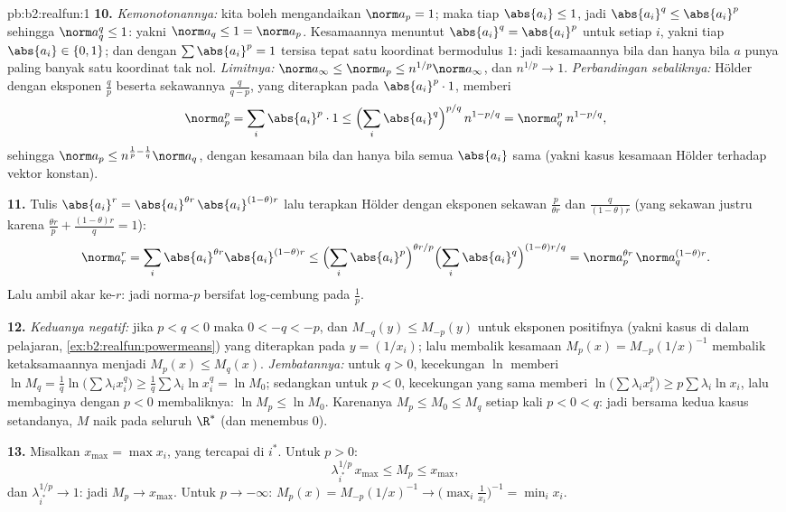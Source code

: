 \begin{solution}{pb:b2:realfun:1}
\textbf{10.} \emph{Kemonotonannya:} kita boleh mengandaikan $\norm a_p =
1$; maka tiap $\abs{a_i} \leq 1$, jadi $\abs{a_i}^q \leq \abs{a_i}^p$
sehingga $\norm a_q^q \leq 1$: yakni $\norm a_q \leq 1 = \norm a_p$.
Kesamaannya menuntut $\abs{a_i}^q = \abs{a_i}^p$ untuk setiap $i$,
yakni tiap $\abs{a_i} \in \{0, 1\}$; dan dengan $\sum\abs{a_i}^p = 1$
tersisa tepat satu koordinat bermodulus $1$: jadi kesamaannya bila dan
hanya bila $a$ punya paling banyak satu koordinat tak nol.
\emph{Limitnya:} $\norm a_\infty \leq \norm a_p \leq n^{1/p}\norm
a_\infty$, dan $n^{1/p} \to 1$.
\emph{Perbandingan sebaliknya:} Hölder dengan eksponen $\frac
qp$ beserta sekawannya $\frac{q}{q-p}$, yang diterapkan pada
$\abs{a_i}^p\cdot 1$, memberi
\[
\norm a_p^p = \sum_i\abs{a_i}^p\cdot 1 \leq
\Bigl(\sum_i\abs{a_i}^{q}\Bigr)^{p/q}\,n^{1 - p/q}
= \norm a_q^{p}\; n^{1-p/q},
\]
sehingga $\norm a_p \leq n^{\frac1p - \frac1q}\norm a_q$, dengan
kesamaan bila dan hanya bila semua $\abs{a_i}$ sama (yakni kasus
kesamaan Hölder terhadap vektor konstan).

\textbf{11.} Tulis $\abs{a_i}^r = \abs{a_i}^{\theta
r}\,\abs{a_i}^{(1-\theta)r}$ lalu terapkan Hölder dengan
eksponen sekawan $\frac{p}{\theta r}$ dan
$\frac{q}{(1-\theta)r}$ (yang sekawan justru karena $\frac{\theta
r}p + \frac{(1-\theta)r}q = 1$):
\[
\norm a_r^r = \sum_i \abs{a_i}^{\theta r}\abs{a_i}^{(1-\theta)r}
\leq \Bigl(\sum_i\abs{a_i}^{p}\Bigr)^{\theta r/p}
\Bigl(\sum_i\abs{a_i}^{q}\Bigr)^{(1-\theta)r/q}
= \norm a_p^{\theta r}\,\norm a_q^{(1-\theta)r} .
\]
Lalu ambil akar ke-$r$: jadi norma-$p$ bersifat log-cembung pada $\frac1p$.

\textbf{12.} \emph{Keduanya negatif:} jika $p < q < 0$ maka $0 < -q <
-p$, dan $M_{-q}(y) \leq M_{-p}(y)$ untuk eksponen positifnya
(yakni kasus di dalam pelajaran, \cref{ex:b2:realfun:powermeans}) yang
diterapkan pada $y = (1/x_i)$; lalu membalik kesamaan $M_p(x) =
M_{-p}(1/x)^{-1}$ membalik ketaksamaannya menjadi $M_p(x) \leq M_q(x)$.
\emph{Jembatannya:} untuk $q > 0$, kecekungan $\ln$ memberi $\ln M_q =
\frac1q\ln\bigl(\sum\lambda_ix_i^q\bigr) \geq
\frac1q\sum\lambda_i\ln x_i^q = \ln M_0$; sedangkan untuk $p < 0$,
kecekungan yang sama memberi $\ln\bigl(\sum\lambda_ix_i^p\bigr) \geq
p\sum\lambda_i\ln x_i$, lalu membaginya dengan $p < 0$ membaliknya: $\ln
M_p \leq \ln M_0$. Karenanya $M_p \leq M_0 \leq M_q$ setiap kali $p < 0
< q$: jadi bersama kedua kasus setandanya, $M$ naik pada seluruh
$\R^*$ (dan menembus $0$).

\textbf{13.} Misalkan $x_{\max} = \max x_i$, yang tercapai di $i^*$.
Untuk $p > 0$:
\[
\lambda_{i^*}^{1/p}\,x_{\max} \leq M_p \leq x_{\max},
\]
dan $\lambda_{i^*}^{1/p} \to 1$: jadi $M_p \to x_{\max}$. Untuk $p \to
-\infty$: $M_p(x) = M_{-p}(1/x)^{-1} \to
\bigl(\max_i\frac1{x_i}\bigr)^{-1} = \min_ix_i$.


\end{solution}
